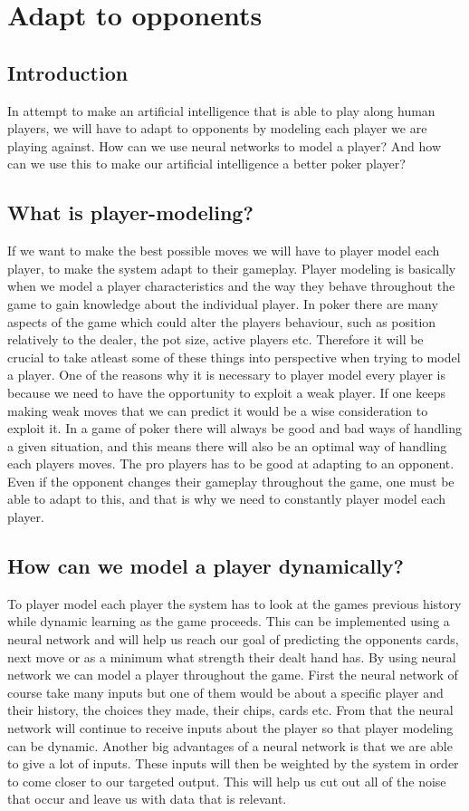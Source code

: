 \section{Adapt to opponents}

\subsection{Introduction}
In attempt to make an artificial intelligence that is able to play along human players, we will have to adapt to opponents by modeling each player we are playing against. How can we use neural networks to model a player? And how can we use this to make our artificial intelligence a better poker player?

\subsection{What is player-modeling?}
If we want to make the best possible moves we will have to player model each player, to make the system adapt to their gameplay.
Player modeling is basically when we model a player characteristics and the way they behave throughout the game to gain knowledge about the individual player. 
In poker there are many aspects of the game which could alter the players behaviour, such as position relatively to the dealer, the pot size, active players etc. Therefore it will be crucial to take atleast some of these things into perspective when trying to model a player. One of the reasons why it is necessary to player model every player is because we need to have the opportunity to exploit a weak player. If one keeps making weak moves that we can predict it would be a wise consideration to exploit it.
In a game of poker there will always be good and bad ways of handling a given situation, and this means there will also be an optimal way of handling each players moves. 
The pro players has to be good at adapting to an opponent. Even if the opponent changes their gameplay throughout the game, one must be able to adapt to this, and that is why we need to constantly player model each player.

\subsection{How can we model a player dynamically?}
To player model each player the system has to look at the games previous history while dynamic learning as the game proceeds.
This can be implemented using a neural network and will help us reach our goal of predicting the opponents cards, next move or as a minimum what strength their dealt hand has. By using neural network we can model a player throughout the game. First the neural network of course take many inputs but one of them would be about a specific player and their history, the choices they made, their chips, cards etc. From that the neural network will continue to receive inputs about the player so that player modeling can be dynamic.
Another big advantages of a neural network is that we are able to give a lot of inputs. These inputs will then be weighted by the system in order to come closer to our targeted output.
This will help us cut out all of the noise that occur and leave us with data that is relevant.


